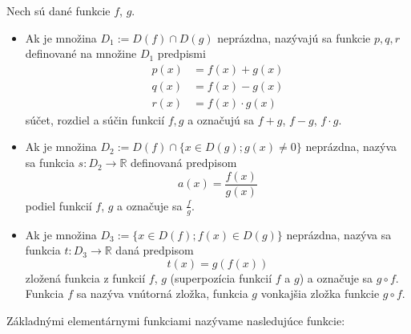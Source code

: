Nech sú dané funkcie $f$, $g$.

\begin{itemize}
  \item
    Ak je množina $D_1:=D(f)\cap D(g)$ neprázdna, nazývajú sa funkcie $p, q, r$
    definované na množine $D_1$ predpismi
    \begin{align*}
      p(x) &= f(x)+g(x) \\
      q(x) &= f(x)-g(x) \\
      r(x) &= f(x)\cdot g(x)
    \end{align*}
    súčet, rozdiel a súčin funkcií $f, g$ a označujú sa $f+g$, $f-g$, $f\cdot g$.
  \item
    Ak je množina $D_2:=D(f)\cap \{x\in D(g);g(x)\neq 0\}$ neprázdna, nazýva sa
    funkcia $s:D_2 \rightarrow \mathbb{R}$ definovaná predpisom
    \[
      a(x)=\frac{f(x)}{g(x)}
    \]
    podiel funkcií $f$, $g$ a označuje sa $\frac{f}{g}$.
  \item
    Ak je množina $D_3:=\{x\in D(f);f(x)\in D(g)\}$ neprázdna, nazýva sa funkcia
    $t:D_3\rightarrow\mathbb{R}$ daná predpisom
    $$t(x)=g(f(x))$$
    zložená funkcia z funkcií $f$, $g$ (superpozícia funkcií $f$ a $g$) a označuje
    sa $g \circ f$. Funkcia $f$ sa nazýva vnútorná zložka, funkcia $g$ vonkajšia
    zložka funkcie $g \circ f$.
\end{itemize}

Základnými elementárnymi funkciami nazývame nasledujúce funkcie:

